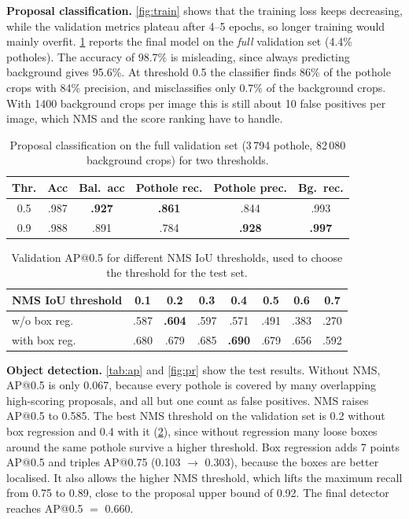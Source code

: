 \documentclass[10pt,twocolumn,letterpaper]{article}
\begin{document}
\noindent\textbf{Proposal classification.}
\cref{fig:train} shows that the training loss keeps decreasing, while the validation metrics plateau after 4--5 epochs, so longer training would mainly overfit. \cref{tab:cls} reports the final model on the \emph{full} validation set (4.4\% potholes). The accuracy of 98.7\% is misleading, since always predicting background gives 95.6\%. At threshold 0.5 the classifier finds 86\% of the pothole crops with 84\% precision, and misclassifies only 0.7\% of the background crops. With 1400 background crops per image this is still about 10 false positives per image, which NMS and the score ranking have to handle.

\begin{table}[t]
\centering
\footnotesize
\setlength{\tabcolsep}{3.5pt}
\begin{tabular}{@{}cccccc@{}}
\toprule
Thr. & Acc & Bal.\ acc & Pothole rec. & Pothole prec. & Bg.\ rec. \\
\midrule
0.5 & .987 & \textbf{.927} & \textbf{.861} & .844 & .993 \\
0.9 & .988 & .891 & .784 & \textbf{.928} & \textbf{.997} \\
\bottomrule
\end{tabular}
\caption{Proposal classification on the full validation set (3\,794 pothole, 82\,080 background crops) for two thresholds.}
\label{tab:cls}
\end{table}

\begin{table}[t]
\centering
\footnotesize
\setlength{\tabcolsep}{3.2pt}
\begin{tabular}{@{}lccccccc@{}}
\toprule
NMS IoU threshold & 0.1 & 0.2 & 0.3 & 0.4 & 0.5 & 0.6 & 0.7 \\
\midrule
w/o box reg. & .587 & \textbf{.604} & .597 & .571 & .491 & .383 & .270 \\
with box reg. & .680 & .679 & .685 & \textbf{.690} & .679 & .656 & .592 \\
\bottomrule
\end{tabular}
\caption{Validation AP@0.5 for different NMS IoU thresholds, used to choose the threshold for the test set.}
\label{tab:nms}
\end{table}

\noindent\textbf{Object detection.}
\cref{tab:ap} and \cref{fig:pr} show the test results. Without NMS, AP@0.5 is only 0.067, because every pothole is covered by many overlapping high-scoring proposals, and all but one count as false positives. NMS raises AP@0.5 to 0.585. The best NMS threshold on the validation set is 0.2 without box regression and 0.4 with it (\cref{tab:nms}), since without regression many loose boxes around the same pothole survive a higher threshold. Box regression adds 7 points AP@0.5 and triples AP@0.75 (0.103 $\to$ 0.303), because the boxes are better localised. It also allows the higher NMS threshold, which lifts the maximum recall from 0.75 to 0.89, close to the proposal upper bound of 0.92. The final detector reaches AP@0.5 $=$ 0.660.
\end{document}
